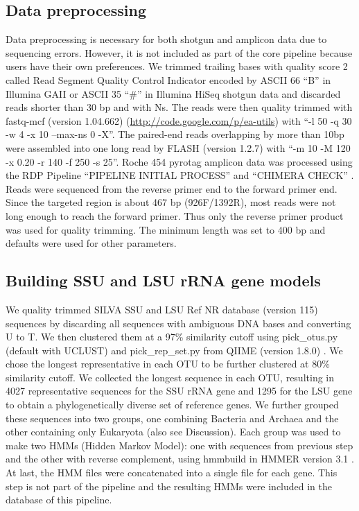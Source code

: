 \documentclass[]{msu-thesis}
\begin{document}
\subsection{Data preprocessing}
Data preprocessing is necessary for both shotgun and amplicon data due to sequencing errors. However, it is not included as part of the core pipeline because users have their own preferences. We trimmed trailing bases with quality score 2 called Read Segment Quality Control Indicator encoded by ASCII 66 ``B'' in Illumina GAII or ASCII 35 ``\#'' in Illumina HiSeq shotgun data and discarded reads shorter than 30 bp and with Ns. The reads were then quality trimmed with fastq-mcf (version 1.04.662) (\url{http://code.google.com/p/ea-utils}) with ``-l 50 -q 30 -w 4 -x 10 --max-ns 0 -X''. The paired-end reads overlapping by more than 10bp were assembled into one long read by FLASH (version 1.2.7) \cite{magoc_flash:_2011} with ``-m 10 -M 120 -x 0.20 -r 140 -f 250 -s 25''. Roche 454 pyrotag amplicon data was processed using the RDP Pipeline ``PIPELINE INITIAL PROCESS'' and ``CHIMERA CHECK'' \cite{cole_ribosomal_2014}. Reads were sequenced from the reverse primer end to the forward primer end. Since the targeted region is about 467 bp (926F/1392R), most reads were not long enough to reach the forward primer. Thus only the reverse primer product was used for quality trimming. The minimum length was set to 400 bp and defaults were used for other parameters.

\subsection{Building SSU and LSU rRNA gene models}
We quality trimmed SILVA \cite{quast_silva_2013} SSU and LSU Ref NR database (version 115) sequences by discarding all sequences with ambiguous DNA bases and converting U to T. We then clustered them at a 97\% similarity cutoff using pick\_otus.py (default with UCLUST) and pick\_rep\_set.py from QIIME (version 1.8.0) \cite{kuczynski_using_2012}. We chose the longest representative in each OTU to be further clustered at 80\% similarity cutoff. We collected the longest sequence in each OTU, resulting in 4027 representative sequences for the SSU rRNA gene and 1295 for the LSU gene to obtain a phylogenetically diverse set of reference genes. We further grouped these sequences into two groups, one combining Bacteria and Archaea and the other containing only Eukaryota (also see Discussion). Each group was used to make two HMMs (Hidden Markov Model): one with sequences from previous step and the other with reverse complement, using hmmbuild in HMMER version 3.1 \cite{eddy_new_2009}. At last, the HMM files were concatenated into a single file for each gene. This step is not part of the pipeline and the resulting HMMs were included in the database of this pipeline.
\end{document}
